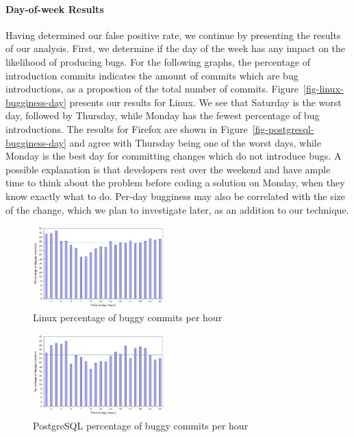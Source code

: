 \paragraph{Day-of-week Results} Having determined our false positive rate, 
we continue by presenting the results of our analysis.  First, we
determine if the day of the week has any impact on the likelihood of
producing bugs. For the following graphs, the percentage of
introduction commits indicates the amount of commits which are bug
introductions, as a propostion of the total number of
commits. Figure~\ref{fig-linux-bugginess-day} presents our results for
Linux. We see that Saturday is the worst day, followed by Thursday,
while Monday has the fewest percentage of bug introductions. The
results for Firefox are shown in Figure~\ref{fig-postgresql-bugginess-day} and
agree with Thursday being one of the worst days, while Monday is the
best day for committing changes which do not introduce bugs. A
possible explanation is that developers rest over the weekend and have
ample time to think about the problem before coding a solution on
Monday, when they know exactly what to do. Per-day bugginess may also
be correlated with the size of the change, which we plan to investigate
later, as an addition to our technique.

\begin{figure}
\begin{center}
\includegraphics[width=0.45\textwidth]{linux-bugginess-hour.pdf}
\end{center}
\caption{Linux percentage of buggy commits per hour}
\label{fig-linux-bugginess-hour}
\end{figure}

\begin{figure}
\begin{center}
\includegraphics[width=0.45\textwidth]{postgresql-bugginess-hour.pdf}
\end{center}
\caption{PostgreSQL percentage of buggy commits per hour}
\label{fig-postgresql-bugginess-hour}
\end{figure}


